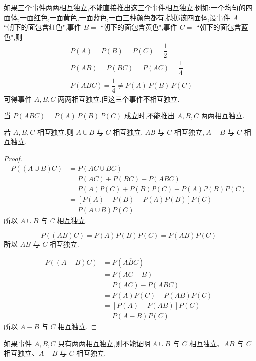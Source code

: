 \begin{note}
    \indent 如果三个事件两两相互独立,不能直接推出这三个事件相互独立.例如:一个均匀的四面体,一面红色,一面黄色,一面蓝色,一面三种颜色都有,抛掷该四面体,设事件 $A=$ ``朝下的面包含红色",事件 $B=$ ``朝下的面包含黄色",事件 $C=$ ``朝下的面包含蓝色",则
    $$
    \begin{aligned}
        & P(A) = P(B) = P(C) = \dfrac{1}{2} \\
        & P(AB) = P(BC) = P(AC) = \dfrac{1}{4} \\
        & P(ABC) = \dfrac{1}{4} \not= P(A) \, P(B) \, P(C)
    \end{aligned}
    $$
    可得事件 $A,B,C$ 两两相互独立,但这三个事件不相互独立.

    当 $P(ABC)=P(A)\,P(B)\,P(C)$ 成立时,不能推出 $A,B,C$ 两两相互独立.
\end{note}

\begin{conclusion}
    \indent 若 $A,B,C$ 相互独立,则 $A \cup B$ 与 $C$ 相互独立, $AB$ 与 $C$ 相互独立, $A-B$ 与 $C$ 相互独立.
\end{conclusion}

\begin{proof}
    $$
    \begin{aligned}
        P((A \cup B) C) &= P(AC \cup BC) \\
        &= P(AC) + P(BC) - P(ABC) \\
        &= P(A) P(C) + P(B) P(C) - P(A) P(B) P(C) \\
        &= [P(A) + P(B) - P(A) P(B)] P(C) \\
        &= P(A \cup B) P(C)
    \end{aligned}
    $$
    所以 $A \cup B$ 与 $C$ 相互独立.

    $$
    P((AB)C) = P(A) P(B) P(C) = P(AB) P(C)
    $$
    所以 $AB$ 与 $C$ 相互独立.

    $$
    \begin{aligned}
        P((A-B)C) &= P(A \overline{B} C) \\
        &= P(AC-B) \\
        &= P(AC) - P(ABC) \\
        &= P(A) P(C) - P(AB) P(C) \\
        &= [P(A) - P(AB)] P(C) \\
        &= P(A-B) P(C)
    \end{aligned}
    $$
    所以 $A-B$ 与 $C$ 相互独立.
\end{proof}

\begin{note}
    \indent 如果事件 $A,B,C$ 只有两两相互独立,则不能证明 $A \cup B$ 与 $C$ 相互独立、$AB$ 与 $C$ 相互独立、$A-B$ 与 $C$ 相互独立.
\end{note}

